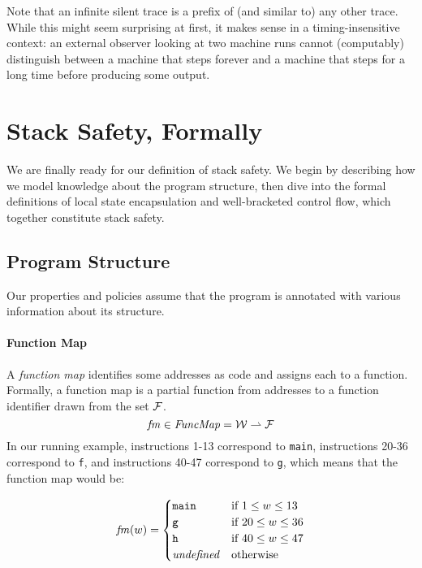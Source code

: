 \documentclass[acmsmall,review,anonymous]{acmart}\settopmatter{printfolios=true,printccs=false,printacmref=false}
\begin{document}
{Note that an infinite silent trace is a
prefix of (and similar to) any other trace. While this might seem
surprising at first, it makes sense in a timing-insensitive context:
an external observer looking at two machine runs cannot (computably)
distinguish between a machine that steps forever and a machine that
steps for a long time before producing some output.

\section{Stack Safety, Formally}
\label{sec:lse-and-wbcf}

We are finally ready for our definition of stack safety. We begin
by describing how we model knowledge about the program structure,
then dive into the formal definitions of local state encapsulation and
well-bracketed control flow, which together constitute stack safety.

\subsection{Program Structure}

Our properties and policies assume that the program is annotated
with various information about its structure.

\paragraph*{Function Map}

A {\em function map} identifies some addresses as code and assigns
each to a function. Formally, a function map is a
partial function from addresses to a function
identifier drawn from the set \(\mathcal{F}\).
\[\mathit{fm} \in \mathit{FuncMap} = {\mathcal W} \rightharpoonup \mathcal{F}\]
%
In our running example, instructions 1-13 correspond to {\tt main},
instructions 20-36 correspond to {\tt f}, and instructions 40-47
correspond to {\tt g}, which means that the function map would be:

\[ \mathit{fm}(w) = 
  \begin{cases}
    \texttt{main} & \text{if } 1 \leq w \leq 13 \\
    \texttt{g} & \text{if } 20 \leq w \leq 36 \\
    \texttt{h} & \text{if } 40 \leq w \leq 47 \\
    \mathit{undefined} & \text {otherwise}\\
  \end{cases}
\]

}
\end{document}
